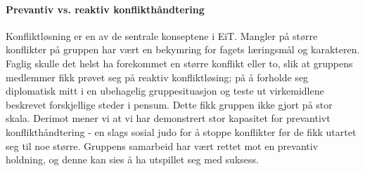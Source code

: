 \paragraph{Prevantiv vs. reaktiv konflikthåndtering}
Konfliktløsning er en av de sentrale konseptene i EiT. Mangler på større konflikter på gruppen har vært en bekymring for fagets læringsmål og karakteren. Faglig skulle det helst ha forekommet en større konflikt eller to, slik at gruppens medlemmer fikk prøvet seg på reaktiv konfliktløsing; på å forholde seg diplomatisk mitt i en ubehagelig gruppesituasjon og teste ut virkemidlene beskrevet forskjellige steder i pensum. 
Dette fikk gruppen ikke gjort på stor skala. Derimot mener vi at vi har demonstrert stor kapasitet for prevantivt konflikthåndtering - en slags sosial judo for å stoppe konflikter før de fikk utartet seg til noe større. Gruppens samarbeid har vært rettet mot en prevantiv holdning, og denne kan sies å ha utspillet seg med suksess. 

